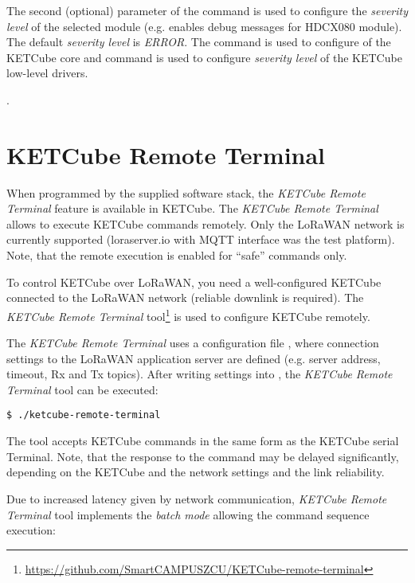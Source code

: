 The second (optional) parameter of the  command is used to configure the {\it severity level} of the selected module (e.g.  enables debug messages for HDCX080 module). The default  {\it severity level} is {\it ERROR}. The command  is used to configure  of the KETCube core and command  is used to configure {\it severity level} of the KETCube low-level drivers.

.

\clearpage 
\section{KETCube Remote Terminal}
When programmed by the supplied software stack, the {\it KETCube Remote Terminal} feature is available in KETCube. The {\it KETCube Remote Terminal} allows to execute KETCube commands remotely. Only the LoRaWAN network is currently supported (loraserver.io with MQTT interface was the test platform). Note, that the remote execution is enabled for ``safe'' commands only.

To control KETCube over LoRaWAN, you need a well-configured KETCube connected to the LoRaWAN network (reliable downlink is required). The {\it KETCube Remote Terminal} tool\footnote{\url{https://github.com/SmartCAMPUSZCU/KETCube-remote-terminal}} is used to configure KETCube remotely.

The {\it KETCube Remote Terminal} uses a configuration file , where connection settings to the LoRaWAN application server are defined (e.g. server address, timeout, Rx and Tx topics). After writing settings into , the {\it KETCube Remote Terminal} tool can be executed:

\begin{Verbatim}[frame=single, fontsize=\small]
$ ./ketcube-remote-terminal
\end{Verbatim}

The tool accepts KETCube commands in the same form as the KETCube serial Terminal. Note, that the response to the command may be delayed significantly, depending on the KETCube and the network settings and the link reliability. 

Due to increased latency given by network communication, {\it KETCube Remote Terminal} tool implements the {\it batch mode} allowing the command sequence execution:

